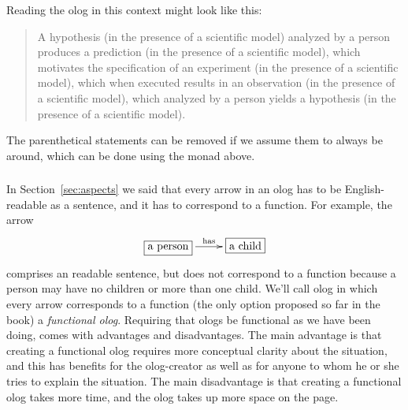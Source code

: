 \documentclass[../main/CT4S-EN-RU]{subfiles}
\begin{document}
\begin{exampleENG}
Reading the olog in this context might look like this:

\begin{quote}
A hypothesis (in the presence of a scientific model) analyzed by a person produces a prediction (in the presence of a scientific model), which motivates the specification of an experiment (in the presence of a scientific model), which when executed results in an observation (in the presence of a scientific model), which analyzed by a person yields a hypothesis (in the presence of a scientific model).
\end{quote}

The parenthetical statements can be removed if we assume them to always be around, which can be done using the monad above.
\end{exampleENG}

\begin{exampleRUS}\label{ex:scientific method}
\end{exampleRUS}


\subsubsection{}\label{sec:relaxing ologs}

\begin{blockENG}
In Section~\ref{sec:aspects} we said that every arrow in an olog has to be English-readable as a sentence, and it has to correspond to a function. For example, the arrow 
\begin{align}\label{dia:non-functional but english}
\xymatrix{\fbox{a person}\LA{r}{has}&\fbox{a child}}
\end{align}
comprises an readable sentence, but does not correspond to a function because a person may have no children or more than one child. 
We'll call olog in which every arrow corresponds to a function (the only option proposed so far in the book) a {\em functional olog}. Requiring that ologs be functional as we have been doing, comes with advantages and disadvantages. The main advantage is that creating a functional olog requires more conceptual clarity about the situation, and this has benefits for the olog-creator as well as for anyone to whom he or she tries to explain the situation. The main disadvantage is that creating a functional olog takes more time, and the olog takes up more space on the page.
\end{blockENG}
\end{document}
